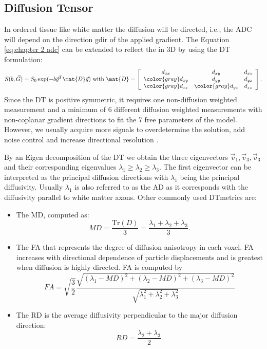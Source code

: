 \subsection{Diffusion Tensor}
\label{subsec:dti}
In ordered tissue like white matter the diffusion will be directed, i.e., the \gls{ADC} will depend on the direction {\gls{gdir}} of the applied gradient. The Equation \ref{eq:chapter 2 adc} can be extended to reflect the in 3D by using the {\gls{DT}} formulation:
\begin{equation}
	S(b,\vec{G}) = S_{0}\exp(-b\vec{g}^T \mat{D}\vec{g}) \mbox{ with } \mat{D} = 
	\left[
	\begin{array}{ccc}
	d_{xx} & d_{xy} & d_{xz} \\
	{\color{gray} d_{xy}} & d_{yy} & d_{yz} \\
	{\color{gray} d_{xz}} & {\color{gray} d_{yz}} & d_{zz} 	
	\end{array} \right].	
    \label{eq:dti}
\end{equation}
Since the {\gls{DT}} is positive symmetric, it requires one non-diffusion weighted measurement and a minimum of 6 different diffusion weighted measurements with non-coplanar gradient directions to fit the 7 free parameters of the model. However, we usually acquire more signals to overdetermine the solution, add noise control and increase directional resolution \citep{Jones:2004a}.

By an Eigen decomposition of the {\gls{DT}} we obtain the three eigenvectors $\vec{v}_1, \vec{v}_3, \vec{v}_3$ and their corresponding eigenvalues $\lambda_1\ge\lambda_2\ge\lambda_3$. The first eigenvector can be interpreted as the principal diffusion directions with $\lambda_1$ being the principal diffusivity. Usually $\lambda_1$ is also referred to as the {\gls{AD}} as it corresponds with the diffusivity parallel to white matter axons\citep{Basser:1996}. Other commonly used {\gls{DT}}metrics are:
\begin{itemize}
	\item The {\gls{MD}}, computed as:
	\begin{equation}
		MD = \frac{\mbox{Tr}(D)}{3} = \frac{\lambda_1 + \lambda_2 +\lambda_3}{3}.
	\end{equation}
	\item The {\gls{FA}} that represents the degree of diffusion anisotropy in each voxel.  {\gls{FA}} increases
	with directional dependence of particle displacements and is greatest when diffusion is highly directed.  {\gls{FA}} is computed by
	\begin{equation}
		FA = \sqrt{\frac{3}{2}}\frac{\sqrt{(\lambda_1-MD)^2+(\lambda_2-MD)^2+(\lambda_3-MD)^2}}{\sqrt{\lambda_1^2+\lambda_2^2+\lambda_3^2}}
	\end{equation}
	\item The {\gls{RD}} is the average diffusivity perpendicular to the major diffusion direction:
	\begin{equation}
		RD = \frac{\lambda_2 + \lambda_3}{2}.
	\end{equation}
\end{itemize}

